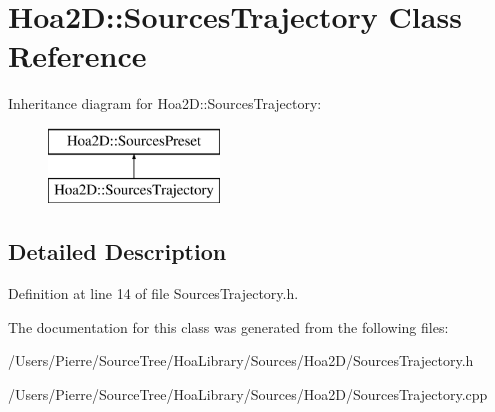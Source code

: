 \hypertarget{class_hoa2_d_1_1_sources_trajectory}{\section{Hoa2\-D\-:\-:Sources\-Trajectory Class Reference}
\label{class_hoa2_d_1_1_sources_trajectory}
}
Inheritance diagram for Hoa2\-D\-:\-:Sources\-Trajectory\-:\begin{figure}[H]
\begin{center}
\leavevmode
\includegraphics[height=2.000000cm]{class_hoa2_d_1_1_sources_trajectory}
\end{center}
\end{figure}


\subsection{Detailed Description}


Definition at line 14 of file Sources\-Trajectory.\-h.



The documentation for this class was generated from the following files\-:\begin{DoxyCompactItemize}
\item 
/\-Users/\-Pierre/\-Source\-Tree/\-Hoa\-Library/\-Sources/\-Hoa2\-D/Sources\-Trajectory.\-h\item 
/\-Users/\-Pierre/\-Source\-Tree/\-Hoa\-Library/\-Sources/\-Hoa2\-D/Sources\-Trajectory.\-cpp\end{DoxyCompactItemize}

